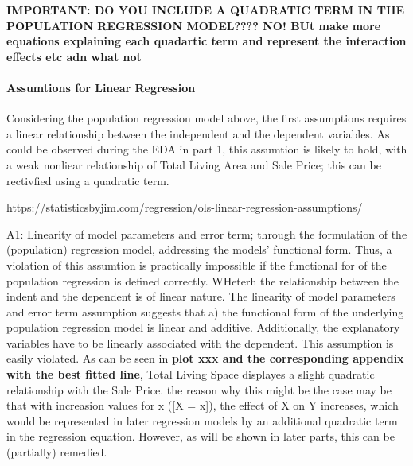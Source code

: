 \documentclass{article}
\begin{document}



\textbf{IMPORTANT: DO YOU INCLUDE A QUADRATIC TERM IN THE POPULATION REGRESSION MODEL???? NO! BUt make more equations explaining each quadartic term and represent the interaction effects etc adn what not }






\indent \paragraph{Assumtions for Linear Regression} Considering the population regression model above, the first assumptions requires a linear relationship between the independent and the dependent variables. As could be observed during the EDA in part 1, this assumtion is likely to hold, with a weak nonliear relationship of Total Living Area and Sale Price; this can be rectivfied using a quadratic term. 

https://statisticsbyjim.com/regression/ols-linear-regression-assumptions/

A1: Linearity of model parameters and error term; through the formulation of the (population) regression model, addressing the models' functional form. Thus, a violation of this assumtion is practically impossible if the functional for of the population regression is defined correctly. WHeterh the relationship between the indent and the dependent is of linear nature.
The linearity of model parameters and error term assumption suggests that a) the functional form of the underlying population regression model is linear and additive. Additionally, the explanatory variables have to be linearly associated with the dependent. This assumption is easily violated. As can be seen in \textbf{plot xxx and the corresponding appendix with the best fitted line}, Total Living Space displayes a slight quadratic relationship with the Sale Price. the reason why this might be the case may be that with increasion values for x ([X = x]), the effect of X on Y increases, which would be represented in later regression models by an additional quadratic term in the regression equation. However, as will be shown in later parts, this can be (partially) remedied.
\end{document}
